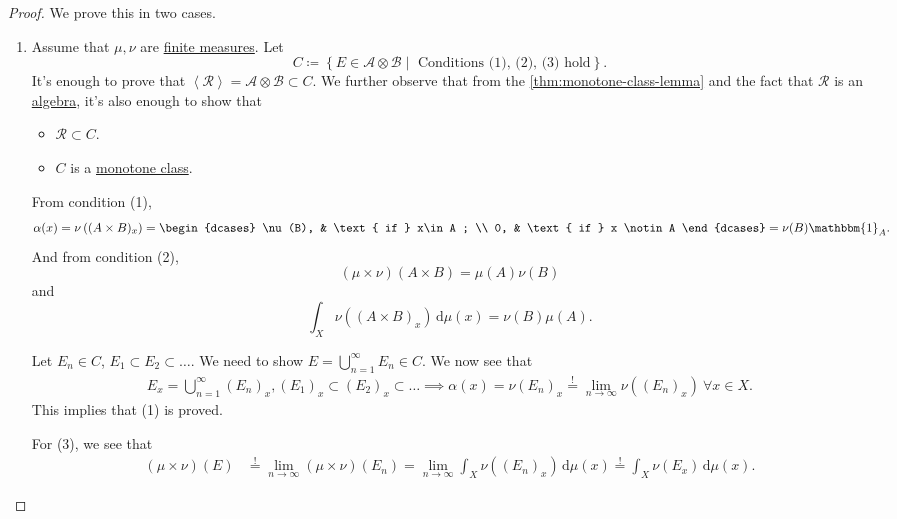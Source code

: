 \begin{proof}
	We prove this in two cases.
	\begin{enumerate}
		\item Assume that \(\mu , \nu \) are \hyperref[def:finite-measure]{finite measures}. Let
		      \[
			      C \coloneqq \left\{E\in \mathcal{A} \otimes \mathcal{B} \mid \text{ Conditions (1), (2), (3) hold} \right\}.
		      \]
		      It's enough to prove that \(\left< \mathcal{R}  \right> = \mathcal{A} \otimes \mathcal{B} \subset C\).
		      We further observe that from the \autoref{thm:monotone-class-lemma} and the fact that \(\mathcal{R} \) is an \hyperref[def:algebra]{algebra},
		      it's also enough to show that
		      \begin{itemize}
			      \item \(\mathcal{R} \subset C\).
			      \item \(C\) is a \hyperref[def:monotone-class]{monotone class}.
		      \end{itemize}
		      \par From condition (1),
		      \[
			      \alpha (x) = \nu \left((A\times B)_x\right) = \begin{dcases}
				      \nu (B), & \text{ if } x\in A ;   \\
				      0,       & \text{ if } x \notin A
			      \end{dcases} = \nu (B)\mathbbm{1}_{A}.
		      \]
		      And from condition (2),
		      \[
			      (\mu \times \nu )(A\times B) = \mu (A)\nu (B)
		      \]
		      and
		      \[
			      \int _X \nu ((A\times B)_x)\,\mathrm{d} \mu (x) = \nu (B)\mu (A).
		      \]

		      \par Let \(E_{n} \in C\), \(E_1\subset E_{2}\subset \dots\). We need to show \(E = \bigcup\limits_{n=1}^{\infty} E_{n} \in C\).
		      We now see that
		      \[
			      \begin{split}
				      E_{x}  = \bigcup\limits_{n=1}^{\infty} (E_{n} )_x, (E_1)_x\subset (E_2)_x\subset \dots
				      \implies \alpha (x) = \nu (E_n)_x \overset{\hyperref[thm:measure-space-continuity-from-below]{!}}{=} \lim\limits_{n \to \infty} \nu ((E_n)_x)\ \forall x\in X.
			      \end{split}
		      \]
		      This implies that (1) is proved.

		      For (3), we see that
		      \[
			      \begin{split}
				      (\mu \times \nu )(E)&\overset{\hyperref[thm:measure-space-continuity-from-below]{!}}{=}\lim\limits_{n \to \infty} (\mu \times \nu )(E_{n} )
				      = \lim\limits_{n \to \infty} \int _X \nu ((E_{n})_x) \,\mathrm{d} \mu (x)
				      \overset{\hyperref[thm:MCT]{!}}{=} \int _X \nu (E_{x} )\,\mathrm{d} \mu (x).
			      \end{split}
		      \]


\end{enumerate}
\end{proof}
